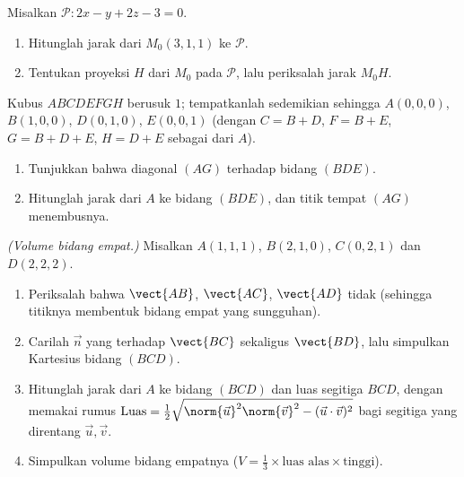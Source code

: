 \begin{exercise}[$\star\star$]\label{exo:g12:space:7}
Misalkan $\mathcal P : 2x - y + 2z - 3 = 0$.
\begin{enumerate}
  \item Hitunglah jarak dari $M_0(3, 1, 1)$ ke $\mathcal P$.
  \item Tentukan  proyeksi  $H$ dari
        $M_0$ pada $\mathcal P$, lalu periksalah jarak $M_0H$.
\end{enumerate}
\end{exercise}

\begin{exercise}[$\star\star\star$]\label{exo:g12:space:8}
Kubus $ABCDEFGH$ berusuk $1$; tempatkanlah  sedemikian sehingga
$A(0,0,0)$, $B(1,0,0)$, $D(0,1,0)$, $E(0,0,1)$ (dengan
$C = B + D$, $F = B + E$, $G = B + D + E$, $H = D + E$ sebagai  dari
$A$).
\begin{enumerate}
  \item Tunjukkan bahwa diagonal $(AG)$  terhadap bidang $(BDE)$.
  \item Hitunglah jarak dari $A$ ke bidang $(BDE)$, dan titik
        tempat $(AG)$ menembusnya.
\end{enumerate}
\end{exercise}

\begin{exercise}[$\star\star\star$]\label{exo:g12:space:9}
\emph{(Volume bidang empat.)} Misalkan $A(1,1,1)$, $B(2,1,0)$, $C(0,2,1)$
dan $D(2,2,2)$.
\begin{enumerate}
  \item Periksalah bahwa $\vect{AB}$, $\vect{AC}$, $\vect{AD}$ tidak 
        (sehingga titiknya membentuk bidang empat yang sungguhan).
  \item Carilah  $\vec n$ yang  terhadap $\vect{BC}$ sekaligus
        $\vect{BD}$, lalu simpulkan  Kartesius bidang $(BCD)$.
  \item Hitunglah jarak dari $A$ ke bidang $(BCD)$ dan luas
        segitiga $BCD$, dengan memakai rumus
        $\text{Luas} = \frac12\sqrt{\norm{\vec u}^2\norm{\vec v}^2 -
        (\vec u \cdot \vec v)^2}$ bagi segitiga yang direntang
        $\vec u, \vec v$.
  \item Simpulkan volume bidang empatnya
        ($V = \frac13 \times \text{luas alas} \times \text{tinggi}$).
\end{enumerate}
\end{exercise}

